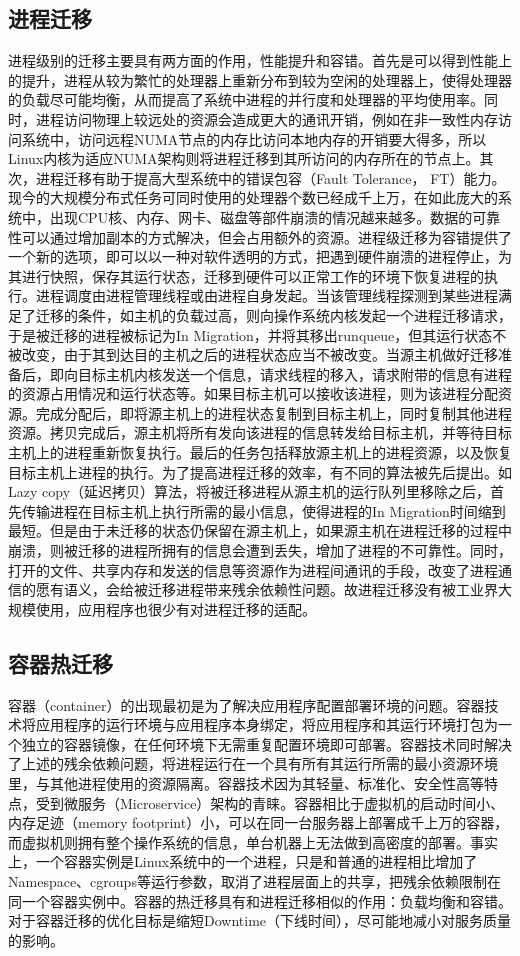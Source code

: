 \subsection{进程迁移}
进程级别的迁移主要具有两方面的作用，性能提升和容错\cite{processmigration}。首先是可以得到性能上的提升，进程从较为繁忙的处理器上重新分布到较为空闲的处理器上，使得处理器的负载尽可能均衡，从而提高了系统中进程的并行度和处理器的平均使用率。同时，进程访问物理上较远处的资源会造成更大的通讯开销，例如在非一致性内存访问系统中，访问远程NUMA节点的内存比访问本地内存的开销要大得多，所以Linux内核为适应NUMA架构则将进程迁移到其所访问的内存所在的节点上。其次，进程迁移有助于提高大型系统中的错误包容（Fault Tolerance， FT）能力。现今的大规模分布式任务可同时使用的处理器个数已经成千上万，在如此庞大的系统中，出现CPU核、内存、网卡、磁盘等部件崩溃的情况越来越多。数据的可靠性可以通过增加副本的方式解决，但会占用额外的资源。进程级迁移为容错提供了一个新的选项，即可以以一种对软件透明的方式，把遇到硬件崩溃的进程停止，为其进行快照，保存其运行状态，迁移到硬件可以正常工作的环境下恢复进程的执行。进程调度由进程管理线程或由进程自身发起。当该管理线程探测到某些进程满足了迁移的条件，如主机的负载过高，则向操作系统内核发起一个进程迁移请求，于是被迁移的进程被标记为In Migration，并将其移出runqueue，但其运行状态不被改变，由于其到达目的主机之后的进程状态应当不被改变。当源主机做好迁移准备后，即向目标主机内核发送一个信息，请求线程的移入，请求附带的信息有进程的资源占用情况和运行状态等。如果目标主机可以接收该进程，则为该进程分配资源。完成分配后，即将源主机上的进程状态复制到目标主机上，同时复制其他进程资源。拷贝完成后，源主机将所有发向该进程的信息转发给目标主机，并等待目标主机上的进程重新恢复执行。最后的任务包括释放源主机上的进程资源，以及恢复目标主机上进程的执行。为了提高进程迁移的效率，有不同的算法被先后提出\cite{migrationppt}。如Lazy copy（延迟拷贝）算法，将被迁移进程从源主机的运行队列里移除之后，首先传输进程在目标主机上执行所需的最小信息，使得进程的In Migration时间缩到最短。但是由于未迁移的状态仍保留在源主机上，如果源主机在进程迁移的过程中崩溃，则被迁移的进程所拥有的信息会遭到丢失，增加了进程的不可靠性。同时，打开的文件、共享内存和发送的信息等资源作为进程间通讯的手段，改变了进程通信的愿有语义，会给被迁移进程带来残余依赖性问题。故进程迁移没有被工业界大规模使用，应用程序也很少有对进程迁移的适配。
\subsection{容器热迁移}
容器（container）\cite{container}的出现最初是为了解决应用程序配置部署环境的问题。容器技术将应用程序的运行环境与应用程序本身绑定，将应用程序和其运行环境打包为一个独立的容器镜像，在任何环境下无需重复配置环境即可部署。容器技术同时解决了上述的残余依赖问题，将进程运行在一个具有所有其运行所需的最小资源环境里，与其他进程使用的资源隔离。容器技术因为其轻量、标准化、安全性高等特点，受到微服务（Microservice）架构的青睐。容器相比于虚拟机的启动时间小、内存足迹（memory footprint）小，可以在同一台服务器上部署成千上万的容器，而虚拟机则拥有整个操作系统的信息，单台机器上无法做到高密度的部署。事实上，一个容器实例是Linux系统中的一个进程，只是和普通的进程相比增加了Namespace、cgroups等运行参数，取消了进程层面上的共享，把残余依赖限制在同一个容器实例中。容器的热迁移\cite{Voyager}具有和进程迁移相似的作用：负载均衡和容错。对于容器迁移的优化目标是缩短Downtime（下线时间），尽可能地减小对服务质量的影响。

